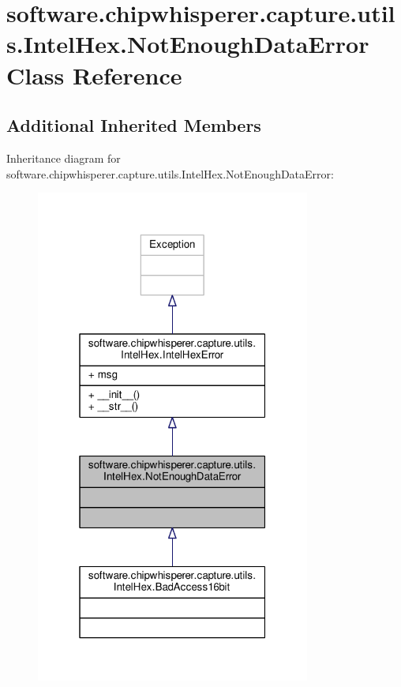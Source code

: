 \hypertarget{classsoftware_1_1chipwhisperer_1_1capture_1_1utils_1_1IntelHex_1_1NotEnoughDataError}{}\section{software.\+chipwhisperer.\+capture.\+utils.\+Intel\+Hex.\+Not\+Enough\+Data\+Error Class Reference}
\label{classsoftware_1_1chipwhisperer_1_1capture_1_1utils_1_1IntelHex_1_1NotEnoughDataError}
\subsection*{Additional Inherited Members}


Inheritance diagram for software.\+chipwhisperer.\+capture.\+utils.\+Intel\+Hex.\+Not\+Enough\+Data\+Error\+:\nopagebreak
\begin{figure}[H]
\begin{center}
\leavevmode
\includegraphics[width=256pt]{dd/d2a/classsoftware_1_1chipwhisperer_1_1capture_1_1utils_1_1IntelHex_1_1NotEnoughDataError__inherit__graph}
\end{center}
\end{figure}


